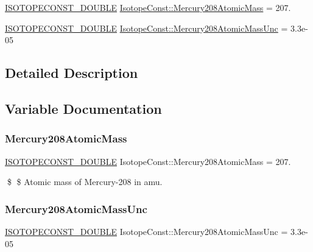 \begin{DoxyCompactItemize}
\item 
\mbox{\hyperlink{group___isotope_const-_macros_ga8f45a7272ce02c0b4c65c44636ed719a}{I\+S\+O\+T\+O\+P\+E\+C\+O\+N\+S\+T\+\_\+\+D\+O\+U\+B\+LE}} \mbox{\hyperlink{group___isotope_const-_mercury-_hg208_ga3ebafbcede1625790f1c8d70759e9710}{Isotope\+Const\+::\+Mercury208\+Atomic\+Mass}} = 207.
\item 
\mbox{\hyperlink{group___isotope_const-_macros_ga8f45a7272ce02c0b4c65c44636ed719a}{I\+S\+O\+T\+O\+P\+E\+C\+O\+N\+S\+T\+\_\+\+D\+O\+U\+B\+LE}} \mbox{\hyperlink{group___isotope_const-_mercury-_hg208_gac4dfaf5bcf72f92d7e921b1fac98ccb0}{Isotope\+Const\+::\+Mercury208\+Atomic\+Mass\+Unc}} = 3.\+3e-\/05
\end{DoxyCompactItemize}


\subsection{Detailed Description}


\subsection{Variable Documentation}
\mbox{\label{group___isotope_const-_mercury-_hg208_ga3ebafbcede1625790f1c8d70759e9710}} 
\subsubsection{\texorpdfstring{Mercury208\+Atomic\+Mass}{Mercury208AtomicMass}}
{\footnotesize\ttfamily \mbox{\hyperlink{group___isotope_const-_macros_ga8f45a7272ce02c0b4c65c44636ed719a}{I\+S\+O\+T\+O\+P\+E\+C\+O\+N\+S\+T\+\_\+\+D\+O\+U\+B\+LE}} Isotope\+Const\+::\+Mercury208\+Atomic\+Mass = 207.}

\$ \$ Atomic mass of Mercury-\/208 in amu. \mbox{\label{group___isotope_const-_mercury-_hg208_gac4dfaf5bcf72f92d7e921b1fac98ccb0}} 
\subsubsection{\texorpdfstring{Mercury208\+Atomic\+Mass\+Unc}{Mercury208AtomicMassUnc}}
{\footnotesize\ttfamily \mbox{\hyperlink{group___isotope_const-_macros_ga8f45a7272ce02c0b4c65c44636ed719a}{I\+S\+O\+T\+O\+P\+E\+C\+O\+N\+S\+T\+\_\+\+D\+O\+U\+B\+LE}} Isotope\+Const\+::\+Mercury208\+Atomic\+Mass\+Unc = 3.\+3e-\/05}

